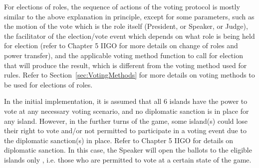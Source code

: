 For elections of roles, the sequence of actions of the voting protocol is mostly similar to the above explanation in principle, except for some parameters, such as the motion of the vote which is the role itself (President, or Speaker, or Judge), the facilitator of the election/vote event which depends on what role is being held for election (refer to Chapter 5 IIGO for more details on change of roles and power transfer), and the applicable voting method function to call for election that will produce the result, which is different from the voting method used for rules. Refer to Section~\ref{sec:VotingMethods} for more details on voting methods to be used for elections of roles.

In the initial implementation, it is assumed that all 6 islands have the power to vote at any necessary voting scenario, and no diplomatic sanction is in place for any island. However, in the further turns of the game, some island(s) could lose their right to vote and/or not permitted to participate in a voting event due to the diplomatic sanction(s) in place. Refer to Chapter 5 IIGO for details on diplomatic sanction. In this case, the Speaker will open the ballots to the eligible islands only , i.e. those who are permitted to vote at a certain state of the game.

